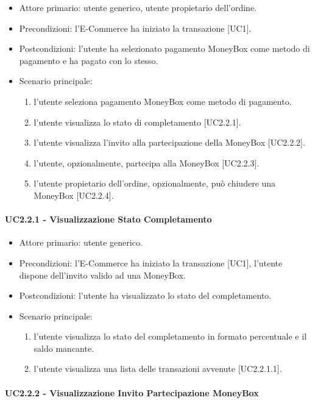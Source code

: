 \begin{itemize}
    \item Attore primario: utente generico, utente propietario dell'ordine.
    \item Precondizioni: l'E-Commerce ha iniziato la transazione [UC1].
    \item Postcondizioni: l'utente ha selezionato pagamento MoneyBox come metodo di pagamento e ha pagato con lo stesso.
    \item Scenario principale:\begin{enumerate}
        \item l'utente seleziona pagamento MoneyBox come metodo di pagamento.
        \item l'utente visualizza lo stato di completamento [UC2.2.1].
        \item l'utente visualizza l'invito alla partecipazione della MoneyBox [UC2.2.2].
        \item l'utente, opzionalmente, partecipa alla MoneyBox [UC2.2.3].
        \item l'utente propietario dell'ordine, opzionalmente, può chiudere una MoneyBox [UC2.2.4].
    \end{enumerate}
\end{itemize}

\paragraph{UC2.2.1 - Visualizzazione Stato Completamento}

\begin{itemize}
    \item Attore primario: utente generico.
    \item Precondizioni: l'E-Commerce ha iniziato la transazione [UC1], l'utente dispone dell'invito valido ad una MoneyBox.
    \item Postcondizioni: l'utente ha visualizzato lo stato del completamento.
    \item Scenario principale: \begin{enumerate}
        \item l'utente visualizza lo stato del completamento in formato percentuale e il saldo mancante.
        \item l'utente visualizza una lista delle transazioni avvenute [UC2.2.1.1].
    \end{enumerate}
    \end{itemize}

\paragraph{UC2.2.2 - Visualizzazione Invito Partecipazione MoneyBox}

